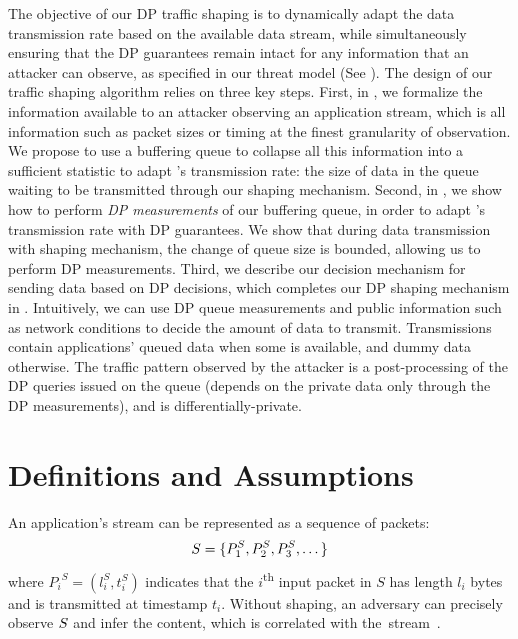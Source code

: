 The objective of our DP traffic shaping is to dynamically adapt the data transmission rate based on the available data stream, while simultaneously ensuring that the DP guarantees remain intact for any information that an attacker can observe, as specified in our threat model (See ).
The design of our traffic shaping algorithm relies on three key steps.
%
First, in , we formalize the information available to an attacker observing an application stream, which is all information such as packet sizes or timing at the finest granularity of observation.
We propose to use a buffering queue to collapse all this information into a sufficient statistic to adapt {\sys}'s transmission rate: the size of data in the queue waiting to be transmitted through our shaping mechanism.
%
Second, in , we show how to perform {\em DP measurements} of our buffering queue, in order to adapt \sys's transmission rate with DP guarantees.
We show that during data transmission with {\sys} shaping mechanism, the change of queue size is bounded, allowing us to perform DP measurements.
%
Third, we describe our decision mechanism for sending data based on DP decisions, which completes our DP shaping mechanism in .
Intuitively, we can use DP queue measurements and public information such as network conditions to decide the amount of data to transmit.
Transmissions contain applications' queued data when some is available, and dummy data otherwise.
The traffic pattern observed by the attacker is a post-processing of the DP queries issued on the queue (depends on the private data only through the DP measurements), and is differentially-private.


\section{Definitions and Assumptions}
\label{sec:dp-shaping-definitions}
An application's stream can be represented as a sequence of packets:
\begin{equation}
    S = \{{P^S_1}, {P^S_2}, {P^S_3}, \dots \}
\end{equation}
where ${P_i}^S = (l^S_i, t^S_i)$ indicates that the $i$\textsuperscript{th} input packet in $S$ has length $l_i$ bytes and is transmitted at timestamp $t_i$.
Without shaping, an adversary can precisely observe $S$ and infer the content, which is correlated with the~stream~\cite{schuster2017beautyburst}.

